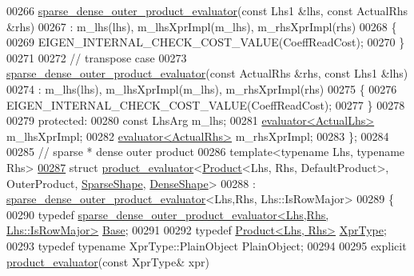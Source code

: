 \begin{DoxyCode}
00266   \hyperlink{struct_eigen_1_1internal_1_1sparse__dense__outer__product__evaluator}{sparse\_dense\_outer\_product\_evaluator}(\textcolor{keyword}{const} Lhs1 &lhs, \textcolor{keyword}{const} ActualRhs
       &rhs)
00267      : m\_lhs(lhs), m\_lhsXprImpl(m\_lhs), m\_rhsXprImpl(rhs)
00268   \{
00269     EIGEN\_INTERNAL\_CHECK\_COST\_VALUE(CoeffReadCost);
00270   \}
00271   
00272   \textcolor{comment}{// transpose case}
00273   \hyperlink{struct_eigen_1_1internal_1_1sparse__dense__outer__product__evaluator}{sparse\_dense\_outer\_product\_evaluator}(\textcolor{keyword}{const} ActualRhs &rhs, \textcolor{keyword}{const} Lhs1
       &lhs)
00274      : m\_lhs(lhs), m\_lhsXprImpl(m\_lhs), m\_rhsXprImpl(rhs)
00275   \{
00276     EIGEN\_INTERNAL\_CHECK\_COST\_VALUE(CoeffReadCost);
00277   \}
00278     
00279 \textcolor{keyword}{protected}:
00280   \textcolor{keyword}{const} LhsArg m\_lhs;
00281   \hyperlink{struct_eigen_1_1internal_1_1evaluator}{evaluator<ActualLhs>} m\_lhsXprImpl;
00282   \hyperlink{struct_eigen_1_1internal_1_1evaluator}{evaluator<ActualRhs>} m\_rhsXprImpl;
00283 \};
00284 
00285 \textcolor{comment}{// sparse * dense outer product}
00286 \textcolor{keyword}{template}<\textcolor{keyword}{typename} Lhs, \textcolor{keyword}{typename} Rhs>
\hyperlink{struct_eigen_1_1internal_1_1product__evaluator_3_01_product_3_01_lhs_00_01_rhs_00_01_default_pro494452499cb2dffb7b0f87034815802e}{00287} \textcolor{keyword}{struct }\hyperlink{struct_eigen_1_1internal_1_1product__evaluator}{product\_evaluator}<\hyperlink{group___core___module_class_eigen_1_1_product}{Product}<Lhs, Rhs, DefaultProduct>, OuterProduct, 
      \hyperlink{struct_eigen_1_1_sparse_shape}{SparseShape}, \hyperlink{struct_eigen_1_1_dense_shape}{DenseShape}>
00288   : \hyperlink{struct_eigen_1_1internal_1_1sparse__dense__outer__product__evaluator}{sparse\_dense\_outer\_product\_evaluator}<Lhs,Rhs, Lhs::IsRowMajor>
00289 \{
00290   \textcolor{keyword}{typedef} \hyperlink{struct_eigen_1_1internal_1_1sparse__dense__outer__product__evaluator}{sparse\_dense\_outer\_product\_evaluator<Lhs,Rhs, Lhs::IsRowMajor>}
       \hyperlink{struct_eigen_1_1internal_1_1sparse__dense__outer__product__evaluator}{Base};
00291   
00292   \textcolor{keyword}{typedef} \hyperlink{group___core___module}{Product<Lhs, Rhs>} \hyperlink{group___core___module}{XprType};
00293   \textcolor{keyword}{typedef} \textcolor{keyword}{typename} XprType::PlainObject PlainObject;
00294 
00295   \textcolor{keyword}{explicit} \hyperlink{struct_eigen_1_1internal_1_1product__evaluator}{product\_evaluator}(\textcolor{keyword}{const} XprType& xpr)

\end{DoxyCode}
